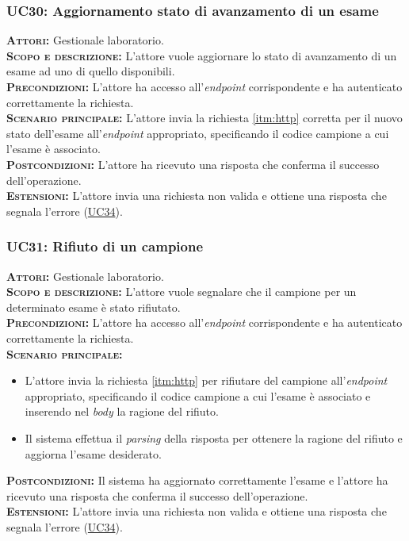 \subsubsection{UC30: Aggiornamento stato di avanzamento di un esame}
\label{sec:UC30}
\textsc{\textbf{Attori:}} Gestionale laboratorio.\\
\textsc{\textbf{Scopo e descrizione:}} L'attore vuole aggiornare lo stato di avanzamento di un esame ad uno di quello disponibili.\\
\textsc{\textsc{\textbf{Precondizioni:}}} L'attore ha accesso all'\textit{endpoint} corrispondente e ha autenticato correttamente la richiesta.\\
\textsc{\textbf{Scenario principale:}}  L'attore invia la richiesta \ref{itm:http} corretta per il nuovo stato dell'esame all'\textit{endpoint} appropriato, specificando il codice campione a cui l'esame è associato.\\
\textsc{\textbf{Postcondizioni:}} L'attore ha ricevuto una risposta che conferma il successo dell'operazione.\\
\textsc{\textbf{Estensioni:}} L'attore invia una richiesta non valida e ottiene una risposta che segnala l'errore (\hyperref[sec:UC34]{UC34}).

\subsubsection{UC31: Rifiuto di un campione}
\label{sec:UC31}
\textsc{\textbf{Attori:}} Gestionale laboratorio.\\
\textsc{\textbf{Scopo e descrizione:}} L'attore vuole segnalare che il campione per un determinato esame è stato rifiutato.\\
\textsc{\textsc{\textbf{Precondizioni:}}} L'attore ha accesso all'\textit{endpoint} corrispondente e ha autenticato correttamente la richiesta.\\
\textsc{\textbf{Scenario principale:}}  
\begin{itemize}
    \item L'attore invia la richiesta \ref{itm:http} per rifiutare del campione all'\textit{endpoint} appropriato, specificando il codice campione a cui l'esame è associato e inserendo nel \textit{body} la ragione del rifiuto.
    \item Il sistema effettua il \textit{parsing} della risposta per ottenere la ragione del rifiuto e aggiorna l'esame desiderato.
\end{itemize}
\textsc{\textbf{Postcondizioni:}} Il sistema ha aggiornato correttamente l'esame e l'attore ha ricevuto una risposta che conferma il successo dell'operazione.\\
\textsc{\textbf{Estensioni:}} L'attore invia una richiesta non valida e ottiene una risposta che segnala l'errore (\hyperref[sec:UC34]{UC34}).


